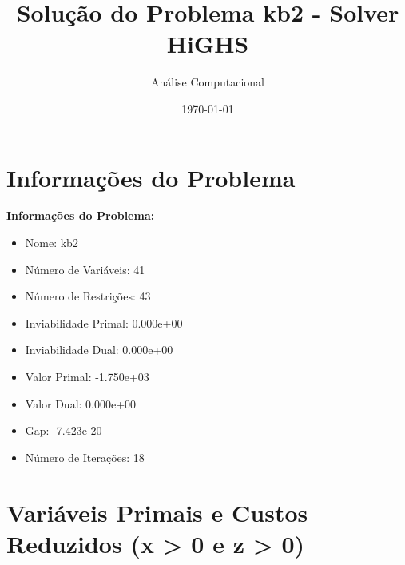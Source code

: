 \documentclass[12pt]{article}
\title{Solução do Problema kb2 - Solver HiGHS}
\author{Análise Computacional}
\date{\today}
\begin{document}
\maketitle

\section{Informações do Problema}

\textbf{Informações do Problema:}
\begin{itemize}
\item Nome: kb2
\item Número de Variáveis: 41
\item Número de Restrições: 43
\item Inviabilidade Primal: 0.000e+00
\item Inviabilidade Dual: 0.000e+00
\item Valor Primal: -1.750e+03
\item Valor Dual: 0.000e+00
\item Gap: -7.423e-20
\item Número de Iterações: 18
\end{itemize}


\section{Variáveis Primais e Custos Reduzidos (x > 0 e z > 0)}
\end{document}
